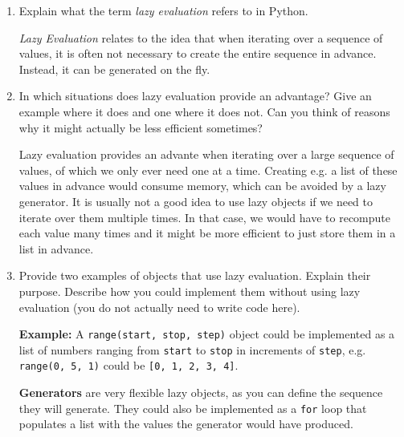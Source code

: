 \begin{enumerate}
    \item Explain what the term {\it lazy evaluation} refers to in Python.

    \vspace{1em}
    \begin{solution}
        {\it Lazy Evaluation} relates to the idea that when iterating over a sequence of values, it is often not necessary to create the entire sequence in advance. Instead, it can be generated on the fly.
    \end{solution}
    \item In which situations does lazy evaluation provide an advantage? Give an example where it does and one where it does not. Can you think of reasons why it might actually be less efficient sometimes?

    \vspace{1em}
    \begin{solution}
        Lazy evaluation provides an advante when iterating over a large sequence of values, of which we only ever need one at a time. Creating e.g. a list of these values in advance would consume memory, which can be avoided by a lazy generator. It is usually not a good idea to use lazy objects if we need to iterate over them multiple times. In that case, we would have to recompute each value many times and it might be more efficient to just store them in a list in advance.
    \end{solution}
    \item Provide two examples of objects that use lazy evaluation. Explain their purpose. Describe how you could implement them without using lazy evaluation (you do not actually need to write code here).

        \vspace{1em}

        {\bf Example:} A {\tt range(start, stop, step)} object could be implemented as a list of numbers ranging from {\tt start} to {\tt stop} in increments of {\tt step}, e.g. {\tt range(0, 5, 1)} could be {\tt [0, 1, 2, 3, 4]}.

        \vspace{1em}
        \begin{solution}
            {\bf Generators} are very flexible lazy objects, as you can define the sequence they will generate. They could also be implemented as a {\tt for} loop that populates a list with the values the generator would have produced.
        \end{solution}
\end{enumerate}

